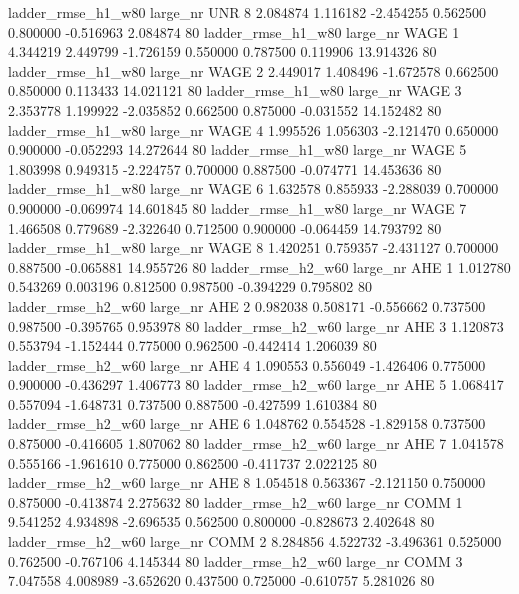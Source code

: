  ladder_rmse_h1_w80   large_nr      UNR                 8  2.084874  1.116182  -2.454255 0.562500 0.800000 -0.516963    2.084874 80
 ladder_rmse_h1_w80   large_nr     WAGE                 1  4.344219  2.449799  -1.726159 0.550000 0.787500  0.119906   13.914326 80
 ladder_rmse_h1_w80   large_nr     WAGE                 2  2.449017  1.408496  -1.672578 0.662500 0.850000  0.113433   14.021121 80
 ladder_rmse_h1_w80   large_nr     WAGE                 3  2.353778  1.199922  -2.035852 0.662500 0.875000 -0.031552   14.152482 80
 ladder_rmse_h1_w80   large_nr     WAGE                 4  1.995526  1.056303  -2.121470 0.650000 0.900000 -0.052293   14.272644 80
 ladder_rmse_h1_w80   large_nr     WAGE                 5  1.803998  0.949315  -2.224757 0.700000 0.887500 -0.074771   14.453636 80
 ladder_rmse_h1_w80   large_nr     WAGE                 6  1.632578  0.855933  -2.288039 0.700000 0.900000 -0.069974   14.601845 80
 ladder_rmse_h1_w80   large_nr     WAGE                 7  1.466508  0.779689  -2.322640 0.712500 0.900000 -0.064459   14.793792 80
 ladder_rmse_h1_w80   large_nr     WAGE                 8  1.420251  0.759357  -2.431127 0.700000 0.887500 -0.065881   14.955726 80
 ladder_rmse_h2_w60   large_nr      AHE                 1  1.012780  0.543269   0.003196 0.812500 0.987500 -0.394229    0.795802 80
 ladder_rmse_h2_w60   large_nr      AHE                 2  0.982038  0.508171  -0.556662 0.737500 0.987500 -0.395765    0.953978 80
 ladder_rmse_h2_w60   large_nr      AHE                 3  1.120873  0.553794  -1.152444 0.775000 0.962500 -0.442414    1.206039 80
 ladder_rmse_h2_w60   large_nr      AHE                 4  1.090553  0.556049  -1.426406 0.775000 0.900000 -0.436297    1.406773 80
 ladder_rmse_h2_w60   large_nr      AHE                 5  1.068417  0.557094  -1.648731 0.737500 0.887500 -0.427599    1.610384 80
 ladder_rmse_h2_w60   large_nr      AHE                 6  1.048762  0.554528  -1.829158 0.737500 0.875000 -0.416605    1.807062 80
 ladder_rmse_h2_w60   large_nr      AHE                 7  1.041578  0.555166  -1.961610 0.775000 0.862500 -0.411737    2.022125 80
 ladder_rmse_h2_w60   large_nr      AHE                 8  1.054518  0.563367  -2.121150 0.750000 0.875000 -0.413874    2.275632 80
 ladder_rmse_h2_w60   large_nr     COMM                 1  9.541252  4.934898  -2.696535 0.562500 0.800000 -0.828673    2.402648 80
 ladder_rmse_h2_w60   large_nr     COMM                 2  8.284856  4.522732  -3.496361 0.525000 0.762500 -0.767106    4.145344 80
 ladder_rmse_h2_w60   large_nr     COMM                 3  7.047558  4.008989  -3.652620 0.437500 0.725000 -0.610757    5.281026 80
